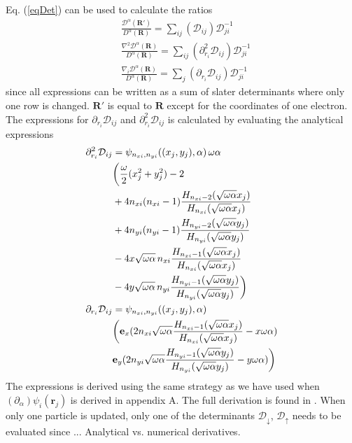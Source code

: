 \documentclass[a4paper,10pt,twocolumn]{article} %
\newcommand{\ts}[1]{\textbf{#1}}
\begin{document}
Eq. (\ref{eqDet}) can be used to calculate the ratios
\begin{align}
	&\frac{\mathcal D^\alpha(\ts R')}{D^\alpha(\ts R)}=\sum_{ij} (\mathcal D_{ij})\mathcal D^{-1}_{ji}\\
	&\frac{\nabla^2\mathcal D^\alpha(\ts R)}{D^\alpha(\ts R)}=\sum_{ij} (\partial^2_{r_i}\mathcal D_{ij})\mathcal D^{-1}_{ji}\\
	&\frac{\nabla_i\mathcal D^\alpha(\ts R)}{D^\alpha(\ts R)}=\sum_{j} (\partial_{r_i}\mathcal D_{ij})\mathcal D^{-1}_{ji}
\end{align}
since all expressions can be written as a sum of slater determinants where only one row is changed. 
$\ts R'$ is equal to $\ts R$ except for the coordinates of one electron.
The expressions for $\partial_{r_i}\mathcal D_{ij}$ and
$\partial^2_{r_i}\mathcal D_{ij}$ is calculated by evaluating the analytical expressions 
\begin{align}
	\partial^2_{r_i}\mathcal D_{ij} &= %
	\psi_{n_{xi},n_{yi}}((x_j,y_j),\alpha) \, \omega\alpha\notag\\
	&\bigg( 
		\frac{\omega}2(x_j^2+y_j^2)-2\notag\\
	&	+4n_{xi}(n_{xi}-1) \frac{H_{n_{xi}-2}(\sqrt{\omega\alpha}x_j)}{H_{n_{xi}}(\sqrt{\omega\alpha}x_j)}\notag\\
	&	+4n_{yi}(n_{yi}-1) \frac{H_{n_{yi}-2}(\sqrt{\omega\alpha}y_j)}{H_{n_{yi}}(\sqrt{\omega\alpha}y_j)}\notag\\
	&		-4x\sqrt{\omega\alpha}\,n_{xi}\frac{H_{n_{xi}-1}(\sqrt{\omega\alpha}x_j)}{H_{n_{xi}}(\sqrt{\omega\alpha}x_j)}\notag\\
	&		-4y\sqrt{\omega\alpha}\,n_{yi}\frac{H_{n_{yi}-1}(\sqrt{\omega\alpha}y_j)}{H_{n_{yi}}(\sqrt{\omega\alpha}y_j)}
	\bigg)\\
 	\partial_{r_i}\mathcal D_{ij} &%
	=\psi_{n_{xi},n_{yi}}((x_j,y_j),\alpha) \notag\\
		&\bigg( 
		\ts e_x(2n_{xi}\sqrt{\omega\alpha}\frac{H_{n_{xi}-1}(\sqrt{\omega\alpha}x_j)}{H_{n_{xi}}(\sqrt{\omega\alpha}x_j)}-x\omega\alpha)\notag\\
		&\ts e_y(2n_{yi}\sqrt{\omega\alpha}\frac{H_{n_{yi}-1}(\sqrt{\omega\alpha}y_j)}{H_{n_{yi}}(\sqrt{\omega\alpha}y_j)}-y\omega\alpha)
		\bigg)
\end{align}
The expressions is derived using the same strategy as we have used when $(\partial_\alpha)\psi_i(\ts r_j)$ is derived in appendix A.
The full derivation is found in \cite{lars_eivind_thesis}.
When only one particle is updated, only one of the determinants $\mathcal D_\downarrow$, $\mathcal D_\uparrow$ needs to be evaluated since ...
Analytical vs. numerical derivatives.
\end{document}
